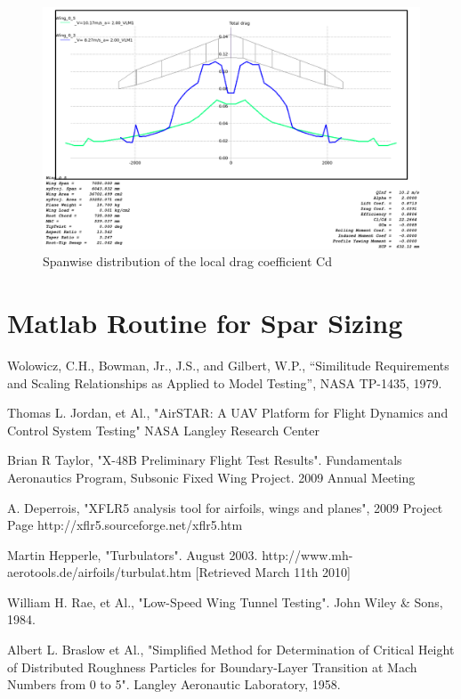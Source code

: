 \documentclass[titlepage,10pt]{article}
\begin{document}
\begin{figure}[h]
\begin{center}
\includegraphics[width=120mm]{XFLR_spandrag_stall.png}
\end{center}
\caption{Spanwise distribution of the local drag coefficient Cd}
\label{fig:tcdrag}
\end{figure}

\clearpage

\newpage
\section{Matlab Routine for Spar Sizing}
\label{app:sparsizing}

\newpage
\begin{thebibliography}{9}

   Wolowicz, C.H., Bowman, Jr., J.S., and Gilbert, W.P.,
   “Similitude Requirements and Scaling Relationships as Applied to Model Testing”, 
   NASA TP-1435, 1979.

	Thomas L. Jordan, et Al.,
	"AirSTAR: A UAV Platform for Flight Dynamics and Control System Testing"
	NASA Langley Research Center

	Brian R Taylor,
	"X-48B Preliminary Flight Test Results".
	Fundamentals Aeronautics Program, Subsonic Fixed Wing Project.
	2009 Annual Meeting

	A. Deperrois,
	"XFLR5 analysis tool for airfoils, wings and planes",
	2009
	Project Page http://xflr5.sourceforge.net/xflr5.htm

	Martin Hepperle,
	"Turbulators".
	August 2003.
	http://www.mh-aerotools.de/airfoils/turbulat.htm
	[Retrieved March 11th 2010]

	William H. Rae, et Al.,
	"Low-Speed Wing Tunnel Testing".
	John Wiley \& Sons, 1984.

	Albert L. Braslow et Al.,
	"Simplified Method for Determination of Critical Height of Distributed Roughness Particles for Boundary-Layer Transition at Mach Numbers from 0 to 5".
	Langley Aeronautic Laboratory, 1958.
\end{thebibliography}
\end{document}
